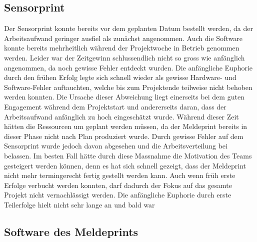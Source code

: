 \subsection{Sensorprint}

Der Sensorprint konnte bereits vor dem geplanten Datum bestellt werden, da der Arbeitsaufwand geringer ausfiel als zunächst angenommen. Auch die Software konnte bereits mehrheitlich während der Projektwoche in Betrieb genommen werden. Leider war der Zeitgewinn schlussendlich nicht so gross wie anfänglich angenommen, da noch gewisse Fehler entdeckt wurden.\newline
Die anfängliche Euphorie durch den frühen Erfolg legte sich schnell wieder als gewisse Hardware- und Software-Fehler auftauchten, welche bis zum Projektende teilweise nicht behoben werden konnten. \newline
Die Ursache dieser Abweichung liegt einerseits bei dem guten Engagement während dem Projektstart und andererseits daran, dass der Arbeitsaufwand anfänglich zu hoch eingeschätzt wurde.\newline
Während dieser Zeit hätten die Ressourcen um geplant werden müssen, da der Meldeprint bereits in dieser Phase nicht nach Plan produziert wurde. Durch gewisse Fehler auf dem Sensorprint wurde jedoch davon abgesehen und die Arbeitsverteilung bei belassen. \newline
Im besten Fall hätte durch diese Massnahme die Motivation des Teams gesteigert werden können, denn es hat sich schnell gezeigt, dass der Meldeprint nicht mehr termingerecht fertig gestellt werden kann.\newline
Auch wenn früh erste Erfolge verbucht werden konnten, darf dadurch der Fokus auf das gesamte Projekt nicht vernachlässigt werden. Die anfängliche Euphorie durch erste Teilerfolge hielt nicht sehr lange an und bald war 
\newpage

\subsection{Software des Meldeprints}

